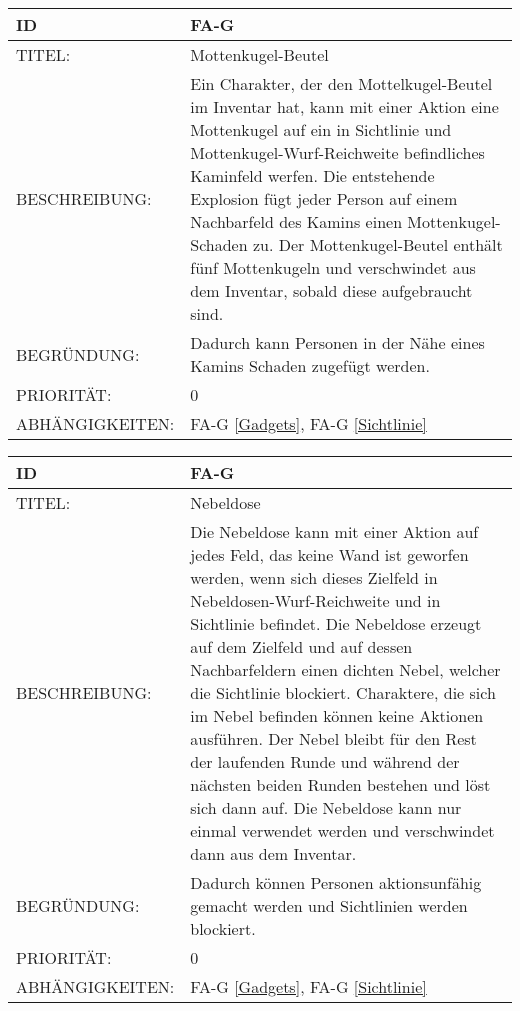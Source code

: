 \begin{tabularx}{16cm}{l|X}
	{table}\label{Mottenkugel-Beutel}
	\textbf{ID} & \textbf{FA-G \arabic{table}} \\
	\hline
	TITEL: & Mottenkugel-Beutel \\
	\hline
	BESCHREIBUNG: & Ein Charakter, der den Mottelkugel-Beutel im Inventar hat, kann mit einer Aktion eine Mottenkugel auf ein in Sichtlinie und Mottenkugel-Wurf-Reichweite befindliches Kaminfeld werfen. Die entstehende Explosion fügt jeder Person auf einem Nachbarfeld des Kamins einen Mottenkugel-Schaden zu. Der Mottenkugel-Beutel enthält fünf Mottenkugeln und verschwindet aus dem Inventar, sobald diese aufgebraucht sind. \\
	\hline
	BEGRÜNDUNG: &  Dadurch kann Personen in der Nähe eines Kamins Schaden zugefügt werden. \\
	\hline
	PRIORITÄT: & 0\\
	\hline
	ABHÄNGIGKEITEN: & FA-G \ref{Gadgets}, FA-G \ref{Sichtlinie} \\
\end{tabularx}

\begin{tabularx}{16cm}{l|X}
	{table}\label{Nebeldose}
	\textbf{ID} & \textbf{FA-G \arabic{table}} \\
	\hline
	TITEL: & Nebeldose \\
	\hline
	BESCHREIBUNG: & Die Nebeldose kann mit einer Aktion auf jedes Feld, das keine Wand ist geworfen werden, wenn sich dieses Zielfeld in Nebeldosen-Wurf-Reichweite und in Sichtlinie befindet. Die Nebeldose erzeugt auf dem Zielfeld und auf dessen Nachbarfeldern einen dichten Nebel, welcher die Sichtlinie blockiert. Charaktere, die sich im Nebel befinden können keine Aktionen ausführen. Der Nebel bleibt für den Rest der laufenden Runde und während der nächsten beiden Runden bestehen und löst sich dann auf. Die Nebeldose kann nur einmal verwendet werden und verschwindet dann aus dem Inventar. \\
	\hline
	BEGRÜNDUNG: &  Dadurch können Personen aktionsunfähig gemacht werden und Sichtlinien werden blockiert. \\
	\hline
	PRIORITÄT: & 0\\
	\hline
	ABHÄNGIGKEITEN: & FA-G \ref{Gadgets}, FA-G \ref{Sichtlinie} \\
\end{tabularx}

